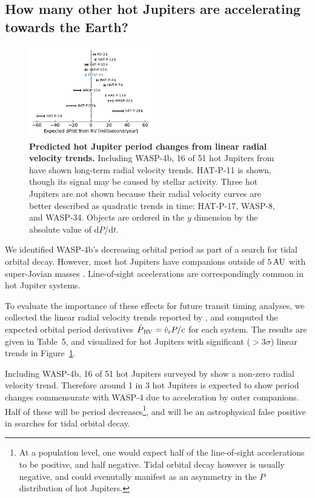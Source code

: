 \documentclass[12pt,twocolumn,tighten]{aastex62}
\begin{document}
\subsection{How many other hot Jupiters are accelerating towards the
Earth?}

\begin{figure}[t]
	\begin{center}
		\leavevmode
		\includegraphics[width=0.48\textwidth]{f5.pdf}
	\end{center}
	\vspace{-0.4cm}
	\caption{
  {\bf Predicted hot Jupiter period changes from linear radial
  velocity trends.} Including WASP-4b, 16 of 51 hot Jupiters from
  \citet{knutson_friends_2014} have shown long-term radial velocity
  trends.  HAT-P-11 is shown, though its signal may be caused
  by stellar activity.  Three hot Jupiters are not shown because
  their radial velocity curves are better described as quadratic
  trends in time: HAT-P-17, WASP-8, and WASP-34.  Objects are ordered
  in the $y$ dimension by the absolute value of d$P$/d$t$.
	\label{fig:pdot_pop}
  \vspace{-0.3cm}
	}
\end{figure}

We identified WASP-4b's decreasing orbital period as part of a search
for tidal orbital decay.  However, most hot Jupiters have companions
outside of $5\,{\rm AU}$ with super-Jovian masses
\citep{knutson_friends_2014,bryan_statistics_2016}.  Line-of-sight
accelerations are correspondingly common in hot Jupiter systems. 

To evaluate the importance of these effects for future transit timing
analyses, we collected the linear radial velocity trends reported by
\citet{knutson_friends_2014}, and computed the expected orbital period
derivatives $\dot{P}_{\rm\,RV} = \dot{v}_{\rm r} P/c$ for each system.
The results are given in Table~5, and visualized for hot Jupiters with
significant ($>$$3\sigma$) linear trends in Figure~\ref{fig:pdot_pop}.

Including WASP-4b, 16 of 51 hot Jupiters surveyed by
\citet{knutson_friends_2014} show a non-zero radial velocity trend.
Therefore around 1 in 3 hot Jupiters is expected to show period
changes commensurate with WASP-4 due to acceleration by outer
companions.  Half of these will be period decreases\footnote{ At a
population level, one would expect half of the line-of-sight
accelerations to be positive, and half negative.  Tidal orbital decay
however is usually negative, and could evenutally manifest as an asymmetry in the
$\dot{P}$ distribution of hot Jupiters.}, and will be an
astrophysical false positive in searches for tidal orbital decay.
\end{document}
